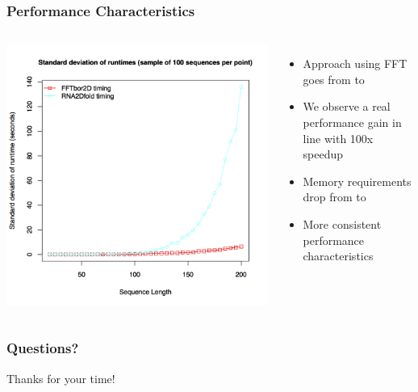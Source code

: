\documentclass{beamer}
\begin{document}
\begin{frame}
  \frametitle{Performance Characteristics}
  \begin{columns}
  \includegraphics[width=\linewidth]{fft2dstdev.png}

  \begin{itemize}
  \item Approach using FFT goes from  to 
  \item We observe a real performance gain in line with 100x speedup
  \item Memory requirements drop from  to 
  \item More consistent performance characteristics
  \end{itemize}
  \end{columns}
\end{frame}

\begin{frame}
  \frametitle{Questions?}

  \centering Thanks for your time!
\end{frame}
\end{document}

